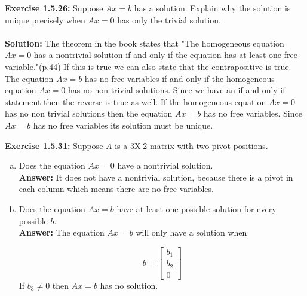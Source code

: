 \documentclass{amsart}
\begin{document}
\noindent\textbf{Exercise 1.5.26: } Suppose $Ax=b$ has a solution. Explain why the solution is unique precisely when $Ax=0$ has only the trivial solution.\\\\
\noindent \textbf{Solution: } The theorem in the book states that "The homogeneous equation $Ax=0$ has a nontrivial solution if and only if  the equation has at least one free variable."(p.44) If this is true we can also state that the contrapositive is true. The equation $Ax=b$ has no free variables if and only if the homogeneous equation $Ax=0$ has no non trivial solutions. Since we have an if and only if statement then the reverse is true as well. If the homogeneous equation $Ax=0$ has no non trivial solutions then the equation $Ax=b$ has no free variables. Since $Ax=b$ has no free variables its solution must be unique.
\vspace{1in}







\noindent\textbf{Exercise 1.5.31: }Suppose $A$ is a 3X􏰍2 matrix with two pivot positions.

\begin{enumerate}[(a)]
\item Does the equation $Ax=0$ have a nontrivial solution. \\
\noindent \textbf{Answer: }It does not have a nontrivial solution, because there is a pivot in each column which means there are no free variables.
\vspace{1in}

\item Does the equation $Ax=b$ have at least one possible solution for every possible $b$. \\
\noindent \textbf{Answer: }The equation $Ax=b$ will only have a solution when 


\begin{equation}
b=\begin{bmatrix}
b_1\\
b_2\\
0
\end{bmatrix}
\end{equation}
If $b_3\neq0$ then $Ax=b$ has no solution.



\vspace{1in}


\end{enumerate}
\vspace{1in}
\end{document}
